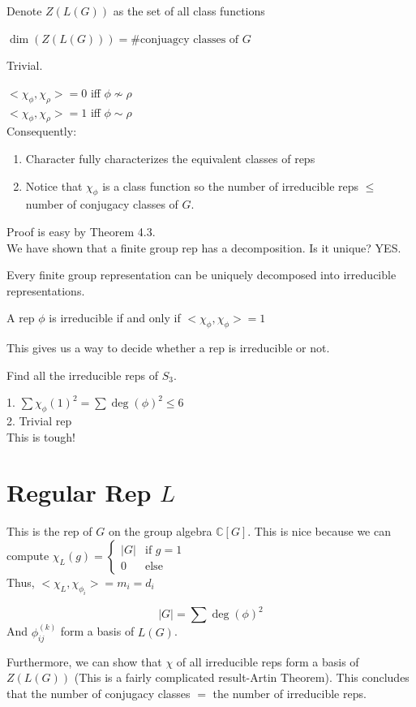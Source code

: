 \documentclass[15pt]{scrartcl}
\newcommand{\C}{\mathbb{C}}
\begin{document}
Denote $Z(L(G))$ as the set of all class functions
\begin{proposition}
$\dim(Z(L(G)))=\#\text{conjuagcy classes of } G$
\end{proposition}
Trivial. 



\begin{theorem}
$<\chi_\phi, \chi_\rho>=0$ iff $\phi\not\sim\rho$
\\
$<\chi_\phi, \chi_\rho>=1$ iff $\phi\sim\rho$
\\

Consequently: 
\begin{enumerate}
\item Character fully characterizes the equivalent classes of reps
\item Notice that $\chi_\phi$ is a class function so the number of irreducible reps $\leq $ number of conjugacy classes of $G$. 
\end{enumerate}
\end{theorem}
Proof is easy by Theorem 4.3. 
\\

We have shown that a finite group rep has a decomposition. Is it unique? YES. 
\begin{theorem}
Every finite group representation can be uniquely decomposed into irreducible representations. 
\end{theorem}
\begin{corollary}
A rep $\phi$ is irreducible if and only if $<\chi_\phi, \chi_\phi>=1$
\end{corollary}
This gives us a way to decide whether a rep is irreducible or not. 

\begin{problem}
Find all the irreducible reps of $S_3$. 
\end{problem}
1. $\sum \chi_\phi(1)^2=\sum \deg(\phi)^2\leq 6$
\\
2. Trivial rep
\\
This is tough!

\section{Regular Rep $L$ }

This is the rep of $G$ on the group algebra $\C[G]$. 
This is nice because we can compute $\chi_L(g)=
\begin{cases}
    |G| & \text{if } g=1 \\
    0 & \text{else}
    \end{cases}$
\\

Thus, $<\chi_L,\chi_{\phi_i}>=m_i=d_i$

\begin{corollary}
\[|G|=\sum \deg(\phi)^2\]
And $\phi_{ij}^{(k)}$ form a basis of $L(G)$. 
\end{corollary}

Furthermore, we can show that $\chi$ of all irreducible reps form a basis of $Z(L(G))$ (This is a fairly complicated result-Artin Theorem). This concludes that the number of conjugacy classes $=$ the number of irreducible reps. 
\end{document}
